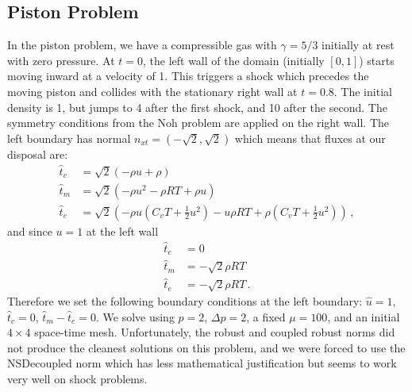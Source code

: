 \documentclass[Dissertation.tex]{subfiles}
\begin{document}
\subsection{Piston Problem}
\label{sec:piston}
In the piston problem, we have a compressible gas with $\gamma=5/3$ initially at rest with zero pressure.
At $t=0$, the left wall of the domain (initially $[0,1]$) starts moving inward at a velocity of 1.
This triggers a shock which precedes the moving piston and collides with the stationary right wall 
at $t=0.8$. The initial density is 1, but jumps to 4 after the first shock, and 10 after the second.
The symmetry conditions from the Noh problem are applied on the right wall. 
The left boundary has normal $n_{xt}=(-\sqrt{2},\sqrt{2})$ which means that fluxes at our disposal are:
\begin{align*}
\hat t_c&=\sqrt{2}(-\rho u+\rho)\\
\hat t_m&=\sqrt{2}(-\rho u^2-\rho RT+\rho u)\\
\hat t_e&=\sqrt{2}(-\rho u(C_vT+\frac{1}{2}u^2)-u\rho RT+\rho(C_vT+\frac{1}{2}u^2))\,,
\end{align*}
and since $u=1$ at the left wall
\begin{align*}
\hat t_c&=0\\
\hat t_m&=-\sqrt{2}\rho RT\\
\hat t_e&=-\sqrt{2}\rho RT\,.
\end{align*}
Therefore we set the following boundary conditions at the left boundary: $\hat u=1$, $\hat t_c=0$, 
$\hat t_m-\hat t_e=0$.
We solve using $p=2$, $\Delta p=2$, a fixed $\mu=100$, and an initial $4\times4$ space-time mesh.
Unfortunately, the robust and coupled robust norms did not produce the cleanest solutions
on this problem, and we were forced to use the NSDecoupled norm which has
less mathematical justification but seems to work very well on shock problems.
\end{document}
